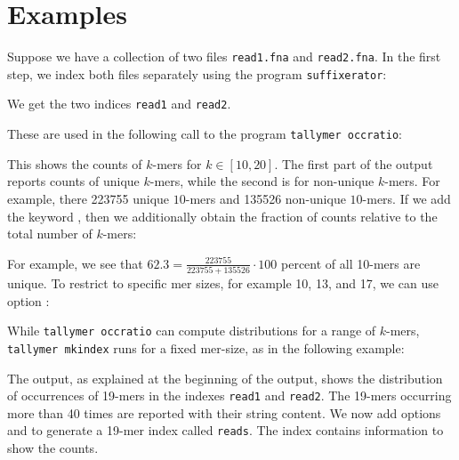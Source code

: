\documentclass[12pt]{article}
\newcommand{\Programname}[1]{\texttt{#1}}
\newcommand{\TYmkindex}[0]{\Programname{tallymer mkindex}\xspace}
\newcommand{\TYoccratio}[0]{\Programname{tallymer occratio}\xspace}
\newcommand{\SFX}[0]{\Programname{suffixerator}\xspace}
\begin{document}
\section{Examples}

Suppose we have a collection of two files \texttt{read1.fna} and
\texttt{read2.fna}. In the first step, we index 
both files separately using the program \SFX:



We get the two indices \texttt{read1} and \texttt{read2}.

These are used in the following call to the program \TYoccratio:


This shows the counts of $k$-mers for $k\in[10,20]$. The first part of the
output reports counts of unique $k$-mers, while the second is for
non-unique $k$-mers. For example, there 223755 unique $10$-mers 
and 135526 non-unique $10$-mers. If we add the keyword 
, then we additionally obtain the fraction
of counts relative to the total number of $k$-mers:


For example, we see that $62.3=\frac{223755}{223755+135526}\cdot 100$
percent of all 10-mers are unique. To restrict to specific mer sizes, for
example 10, 13, and 17, we can use option :


While \TYoccratio can compute distributions for a range of 
$k$-mers, \TYmkindex runs for a fixed mer-size, as in the following example:


The output, as explained at the beginning of the output, shows the
distribution of occurrences of 19-mers in the indexes
\texttt{read1} and \texttt{read2}. The 19-mers occurring more 
than 40 times are reported with their string content.
We now add options  and  to 
generate a 19-mer index called \texttt{reads}. The index contains
information to show the counts.
\end{document}
